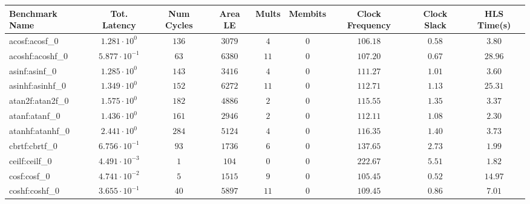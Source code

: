\begin{tabular}{|l|c|c|c|c|c|c|c|c|}
\hline
Benchmark Name               & Tot. Latency            & Num Cycles & Area LE    & Mults   & Membits    & Clock Frequency & Clock Slack & HLS Time(s) \\
\hline
acosf:acosf\_0               & $ 1.281 \cdot 10^{0}  $ & $ 136    $ & $ 3079   $ & $ 4   $ & $ 0      $ & $ 106.18      $ & $ 0.58    $ & $ 3.80    $ \\
acoshf:acoshf\_0             & $ 5.877 \cdot 10^{-1} $ & $ 63     $ & $ 6380   $ & $ 11  $ & $ 0      $ & $ 107.20      $ & $ 0.67    $ & $ 28.96   $ \\
asinf:asinf\_0               & $ 1.285 \cdot 10^{0}  $ & $ 143    $ & $ 3416   $ & $ 4   $ & $ 0      $ & $ 111.27      $ & $ 1.01    $ & $ 3.60    $ \\
asinhf:asinhf\_0             & $ 1.349 \cdot 10^{0}  $ & $ 152    $ & $ 6272   $ & $ 11  $ & $ 0      $ & $ 112.71      $ & $ 1.13    $ & $ 25.31   $ \\
atan2f:atan2f\_0             & $ 1.575 \cdot 10^{0}  $ & $ 182    $ & $ 4886   $ & $ 2   $ & $ 0      $ & $ 115.55      $ & $ 1.35    $ & $ 3.37    $ \\
atanf:atanf\_0               & $ 1.436 \cdot 10^{0}  $ & $ 161    $ & $ 2946   $ & $ 2   $ & $ 0      $ & $ 112.11      $ & $ 1.08    $ & $ 2.30    $ \\
atanhf:atanhf\_0             & $ 2.441 \cdot 10^{0}  $ & $ 284    $ & $ 5124   $ & $ 4   $ & $ 0      $ & $ 116.35      $ & $ 1.40    $ & $ 3.73    $ \\
cbrtf:cbrtf\_0               & $ 6.756 \cdot 10^{-1} $ & $ 93     $ & $ 1736   $ & $ 6   $ & $ 0      $ & $ 137.65      $ & $ 2.73    $ & $ 1.99    $ \\
ceilf:ceilf\_0               & $ 4.491 \cdot 10^{-3} $ & $ 1      $ & $ 104    $ & $ 0   $ & $ 0      $ & $ 222.67      $ & $ 5.51    $ & $ 1.82    $ \\
cosf:cosf\_0                 & $ 4.741 \cdot 10^{-2} $ & $ 5      $ & $ 1515   $ & $ 9   $ & $ 0      $ & $ 105.45      $ & $ 0.52    $ & $ 14.97   $ \\
coshf:coshf\_0               & $ 3.655 \cdot 10^{-1} $ & $ 40     $ & $ 5897   $ & $ 11  $ & $ 0      $ & $ 109.45      $ & $ 0.86    $ & $ 7.01    $ \\

\end{tabular}
